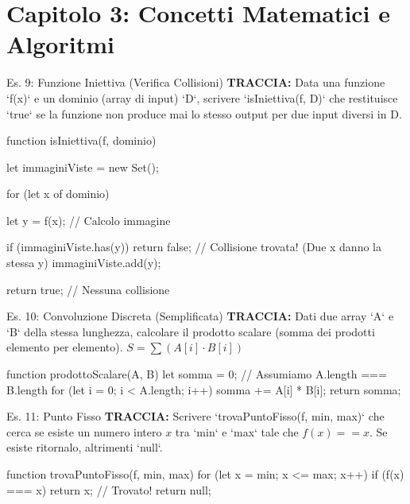 \section{Capitolo 3: Concetti Matematici e Algoritmi}

\begin{esercizio}{Es. 9: Funzione Iniettiva (Verifica Collisioni)}
\textbf{TRACCIA:} Data una funzione `f(x)` e un dominio (array di input) `D`, scrivere `isIniettiva(f, D)` che restituisce `true` se la funzione non produce mai lo stesso output per due input diversi in D.
\end{esercizio}

\begin{jsbox}
function isIniettiva(f, dominio) {
    let immaginiViste = new Set();
    
    for (let x of dominio) {
        let y = f(x); // Calcolo immagine
        
        if (immaginiViste.has(y)) {
            return false; // Collisione trovata! (Due x danno la stessa y)
        }
        immaginiViste.add(y);
    }
    return true; // Nessuna collisione
}
\end{jsbox}

\begin{esercizio}{Es. 10: Convoluzione Discreta (Semplificata)}
\textbf{TRACCIA:} Dati due array `A` e `B` della stessa lunghezza, calcolare il prodotto scalare (somma dei prodotti elemento per elemento).
$S = \sum (A[i] \cdot B[i])$
\end{esercizio}

\begin{jsbox}
function prodottoScalare(A, B) {
    let somma = 0;
    // Assumiamo A.length === B.length
    for (let i = 0; i < A.length; i++) {
        somma += A[i] * B[i];
    }
    return somma;
}
\end{jsbox}

\begin{esercizio}{Es. 11: Punto Fisso}
\textbf{TRACCIA:} Scrivere `trovaPuntoFisso(f, min, max)` che cerca se esiste un numero intero $x$ tra `min` e `max` tale che $f(x) == x$. Se esiste ritornalo, altrimenti `null`.
\end{esercizio}

\begin{jsbox}
function trovaPuntoFisso(f, min, max) {
    for (let x = min; x <= max; x++) {
        if (f(x) === x) {
            return x; // Trovato!
        }
    }
    return null;
}
\end{jsbox}

